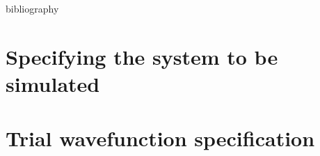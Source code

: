 \documentclass[11pt,usletter]{report}
\begin{document}

\newpage
\tableofcontents
\newpage

\begin{btUnit}
\begin{btSect}{bibliography}










\chapter{Specifying the system to be simulated}



\chapter{Trial wavefunction specification}








































%
%

\btPrintCited
\end{btSect}
\end{btUnit}

\appendix

\begin{btUnit}

\end{btUnit}
\end{document}
